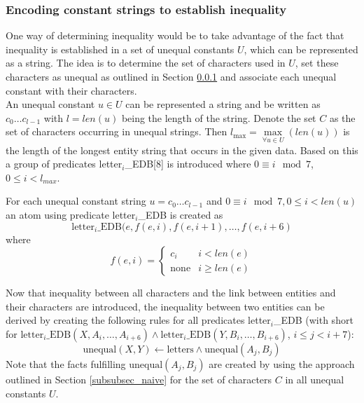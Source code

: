 \documentclass[hyperref,bachelorofscience,fleqn]{cgvpub}
\begin{document}
\subsubsection{Encoding constant strings to establish inequality}\label{subsubsec_encoding}
One way of determining inequality would be to take advantage of the fact that inequality is established in a set of unequal constants \(U\), which can be represented as a string. The idea is to determine the set of characters used in \(U\), set these characters as unequal as outlined in Section \ref{subsubsec_encoding} and associate each unequal constant with their characters.\\

An unequal constant \(u \in U\) can be represented a string and be written as \(c_0 \ldots c_{l - 1}\) with \(l = len(u)\) being the length of the string. Denote the set \(C\) as the set of characters occurring in unequal strings. Then \(l_{\max} = \max\limits_{\forall u \in U}(len(u))\) is the length of the longest entity string that occurs in the given data.
Based on this a group of predicates letter\(_i\)\_EDB[8] is introduced where \(0 \equiv i \mod 7\), \(0 \leq i < l_{max} \). 

For each unequal constant string \(u = c_0 \ldots c_{l - 1}\) and \(0 \equiv i \mod 7, 0 \leq i < len(u)\) an atom using predicate letter\(_i\)\_EDB is created as 
\begin{equation*}
\text{letter}_i\text{\_EDB}(e, f(e, i), f(e, i+1), \ldots, f(e, i+6)
\end{equation*}where
\begin{equation*}
f(e, i) = 
\begin{cases}
      c_i & i < len(e) \\
      \text{none} & i \geq len(e)
\end{cases}
\end{equation*}

Now that inequality between all characters and the link between entities and their characters are introduced, the inequality between two entities can be derived by creating the following rules for all predicates letter\(_i\)\_EDB (with  short for \(\text{letter}_i\text{\_EDB}(X, A_i, \ldots, A_{i+6}) \wedge\text{letter}_i\text{\_EDB}(Y, B_i, \ldots, B_{i+6})\), \(i \leq j < i + 7\)):
\begin{equation*}
\text{unequal}(X, Y) \leftarrow \text{letters} \wedge \text{unequal}(A_j, B_j)
\end{equation*}
Note that the facts fulfilling \(\text{unequal}(A_j, B_j)\) are created by using the approach outlined in Section \ref{subsubsec_naive} for the set of characters \(C\) in all unequal constants \(U\).	
\end{document}
